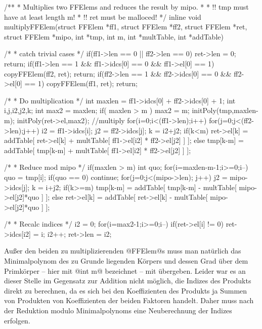 \begin{ccode}[caption={Aus \url{../Sage/enumeratePCNs.c}},
  firstnumber=302]
/**
 * Multiplies two FFElems and reduces the result by mipo.
 *
 * !! tmp must have at least length m!
 * !! ret must be malloced!
 */
inline void multiplyFFElem(struct FFElem *ff1, struct FFElem *ff2, 
        struct FFElem *ret, 
        struct FFElem *mipo, int *tmp, int m,
        int *multTable, int *addTable){
    /* 
     * catch trivial cases
     */
    if(ff1->len == 0 || ff2->len == 0){
        ret->len = 0;
        return;
    }
    if(ff1->len == 1 && ff1->idcs[0] == 0 && ff1->el[0] == 1){
        copyFFElem(ff2, ret);
        return;
    }
    if(ff2->len == 1 && ff2->idcs[0] == 0 && ff2->el[0] == 1){
        copyFFElem(ff1, ret);
        return;
    }

    /*
     * Do multiplication
     */
    int maxlen = ff1->idcs[0] + ff2->idcs[0] + 1;
    int i,j,i2,j2,k;
    int max2 = maxlen;
    if( maxlen > m ){
        max2 = m;
        initPoly(tmp,maxlen-m);
    }
    initPoly(ret->el,max2);
    //multiply 
    for(i=0;i<(ff1->len);i++){
        for(j=0;j<(ff2->len);j++){
            i2 = ff1->idcs[i];
            j2 = ff2->idcs[j];
            k = i2+j2;
            if(k<m){
                ret->el[k] = addTable[ ret->el[k] + 
                    multTable[ ff1->el[i2] * ff2->el[j2] ] ];
            }else{
                tmp[k-m] = addTable[ tmp[k-m] +
                    multTable[ ff1->el[i2] * ff2->el[j2] ] ];
            }
        }
    }
    
    /*
     * Reduce mod mipo
     */
    if(maxlen > m){
        int quo;
        for(i=maxlen-m-1;i>=0;i--){
            quo = tmp[i];
            if(quo == 0) continue;
            for(j=0;j<(mipo->len); j++){
                j2 = mipo->idcs[j];
                k = i+j2;
                if(k>=m){
                    tmp[k-m] = addTable[ tmp[k-m] - 
                        multTable[ mipo->el[j2]*quo ] ];
                }else{
                    ret->el[k] = addTable[ ret->el[k] - 
                        multTable[ mipo->el[j2]*quo ] ];
                }
            }
        }
    }

    /*
     * Recalc indices
     */
    i2 = 0;
    for(i=max2-1;i>=0;i--){
        if(ret->el[i] != 0){
            ret->idcs[i2] = i;
            i2++;
        }
    }
    ret->len = i2;
}
\end{ccode}
Außer den beiden zu multiplizierenden @FFElem@s muss man natürlich das
Minimalpolynom des zu Grunde liegenden Körpers und dessen Grad über dem
Primkörper -- hier mit @int m@ bezeichnet -- mit übergeben.
Leider war es an dieser Stelle im Gegensatz zur Addition nicht 
möglich, die Indizes des Produkts direkt zu berechnen, da es sich bei den
Koeffizienten des Produkts ja Summen von Produkten von Koeffizienten der beiden
Faktoren handelt. Daher muss nach der
Reduktion modulo Minimalpolynoms eine Neuberechnung der Indizes erfolgen.

